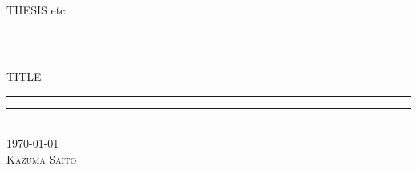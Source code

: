 \documentclass[uplatex, dvipdfmx, ja=standard, 12pt]{bxjsbook}
\begin{document}
\begin{titlepage}
\begin{center}
\vspace*{160truept}
{\Large THESIS etc}\\
\rule{\textwidth}{1.6pt}\vspace*{-\baselineskip}\vspace*{2pt}
\rule{\textwidth}{0.4pt}\\[\baselineskip]
{\Huge TITLE} \\
\rule{\textwidth}{0.4pt}\vspace*{-\baselineskip}\vspace{3.2pt}
\rule{\textwidth}{1.6pt}\\[\baselineskip]
\scshape
{\large \today}\\
\vspace{230truept}
{\huge Kazuma Saito}
\end{center}
\end{titlepage}


\tableofcontents






\end{document}
